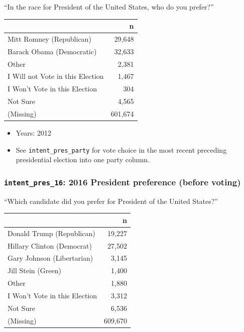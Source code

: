 \documentclass[10pt,article,oneside]{memoir}
\theoremstyle{definition}
\begin{document}
``In the race for President of the United States, who do you prefer?''

\begin{table}[H]
\centering
\begin{tabular}[t]{lr}
\toprule
 & n\\
\midrule
Mitt Romney (Republican) & 29,648\\
Barack Obama (Democratic) & 32,633\\
Other & 2,381\\
I Will not Vote in this Election & 1,467\\
I Won't Vote in this Election & 304\\
Not Sure & 4,565\\
(Missing) & 601,674\\
\bottomrule
\end{tabular}
\end{table}

\begin{itemize}
\tightlist
\item
  Years: 2012
\item
  See \texttt{intent\_pres\_party} for vote choice in the most recent
  preceding presidential election into one party column.
\end{itemize}

\subsubsection{\texorpdfstring{\texttt{intent\_pres\_16}: 2016 President
preference (before
voting)}{intent\_pres\_16: 2016 President preference (before voting)}}\label{intent_pres_16-2016-president-preference-before-voting}

``Which candidate did you prefer for President of the United States?''

\begin{table}[H]
\centering
\begin{tabular}[t]{lr}
\toprule
 & n\\
\midrule
Donald Trump (Republican) & 19,227\\
Hillary Clinton (Democrat) & 27,502\\
Gary Johnson (Libertarian) & 3,145\\
Jill Stein (Green) & 1,400\\
Other & 1,880\\
I Won't Vote in this Election & 3,312\\
Not Sure & 6,536\\
(Missing) & 609,670\\
\bottomrule
\end{tabular}
\end{table}
\end{document}
